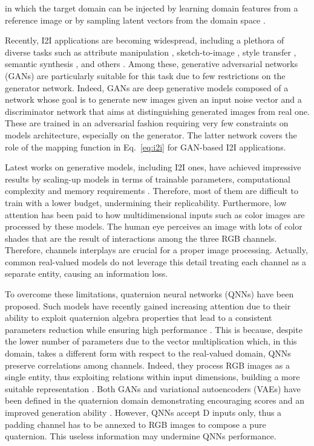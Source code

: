 \documentclass[conference]{IEEEtran}
\begin{document}
\noindent in which the target domain can be injected by learning domain features from a reference image or by sampling latent vectors from the domain space \cite{Choi2020StarGAN2}.

Recently, I2I applications are becoming widespread, including a plethora of diverse tasks such as attribute manipulation \cite{He2019AttGAN, Choi2018StarGAN, Choi2020StarGAN2, Lin2021TPAMI}, sketch-to-image \cite{Almahairi2018CycleGAN, Zhang2020CrossDomainCL}, style transfer \cite{Kim2020UGATIT, Lee2020drit}, semantic synthesis \cite{Park2019SPADE, Chen2020Dist}, and others \cite{Wu2021StyleSpace, chong2021gans, karras2021aliasfree, alaluf2022times}. Among these, generative adversarial networks (GANs) \cite{GoodfellowNIPS2014} are particularly suitable for this task due to few restrictions on the generator network. Indeed, GANs are deep generative models composed of a network whose goal is to generate new images given an input noise vector and a discriminator network that aims at distinguishing generated images from real one. These are trained in an adversarial fashion requiring very few constraints on models architecture, especially on the generator. The latter network covers the role of the mapping function  in Eq.~\ref{eq:i2i} for GAN-based I2I applications.

Latest works on generative models, including I2I ones, have achieved impressive results by scaling-up models in terms of trainable parameters, computational complexity and memory requirements \cite{karras2020analyzing, Brock2019LargeSG, schonfeld2021unet}. Therefore, most of them are difficult to train with a lower budget, undermining their replicability. Furthermore, low attention has been paid to how multidimensional inputs such as color images are processed by these models. The human eye perceives an image with lots of color shades that are the result of interactions among the three RGB channels. Therefore, channels interplays are crucial for a proper image processing. Actually, common real-valued models do not leverage this detail treating each channel as a separate entity, causing an information loss.

To overcome these limitations, quaternion neural networks (QNNs) have been proposed. Such models have recently gained increasing attention due to their ability to exploit quaternion algebra properties that lead to a consistent parameters reduction while ensuring high performance \cite{ParcolletAIR2019, VALLE2021111, ComminielloICASSP2019a, Brignone2022ISCAS}. This is because, despite the lower number of parameters due to the vector multiplication which, in this domain, takes a different form with respect to the real-valued domain, QNNs preserve correlations among channels. Indeed, they process RGB images as a single entity, thus exploiting relations within input dimensions, building a more suitable representation \cite{ParcolletICASSP2019a}. Both GANs and variational autoencoders (VAEs) have been defined in the quaternion domain demonstrating encouraging scores and an improved generation ability \cite{GrassucciQGAN2021, GrassucciICASSP2021, Grassucci2021Entropy}. However, QNNs accept D inputs only, thus a padding channel has to be annexed to RGB images to compose a pure quaternion. This useless information may undermine QNNs performance.
\end{document}
